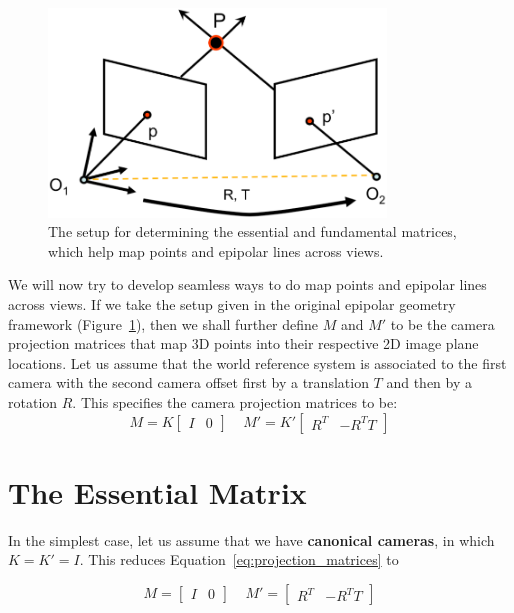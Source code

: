 \documentclass[a4paper, 12pt]{article}
\renewcommand\emph{\textbf}
\begin{document}
\begin{figure}[h!]
\centering
\includegraphics[width=0.8\textwidth]{figures/essential_fundamental_setup.png}
\caption{The setup for determining the essential and fundamental matrices, which help map points and epipolar lines across views.}
\label{fig:essential_fundamental_setup}
\end{figure}

We will now try to develop seamless ways to do map points and epipolar lines across views. If we take the setup given in the original epipolar geometry framework (Figure~\ref{fig:essential_fundamental_setup}), then we shall further define $M$ and $M'$ to be the camera projection matrices that map 3D points into their respective 2D image plane locations. Let us assume that the world reference system is associated to the first camera with the second camera offset first by a translation $T$ and then by a rotation $R$. This specifies the camera projection matrices to be:
\begin{equation}
    M = K\begin{bmatrix} I & 0\end{bmatrix} \ \ \ \ \ M' = K'\begin{bmatrix}R^T & -R^TT\end{bmatrix}
    \label{eq:projection_matrices}
\end{equation}

\section{The Essential Matrix}
In the simplest case, let us assume that we have \emph{canonical cameras}, in which $K = K' = I$. This reduces Equation~\ref{eq:projection_matrices} to 

\begin{equation}
    M = \begin{bmatrix} I & 0\end{bmatrix} \ \ \ \ \ M' = \begin{bmatrix}R^T & -R^TT\end{bmatrix}
    \label{eq:projection_matrices_canonical}
\end{equation}
\end{document}
